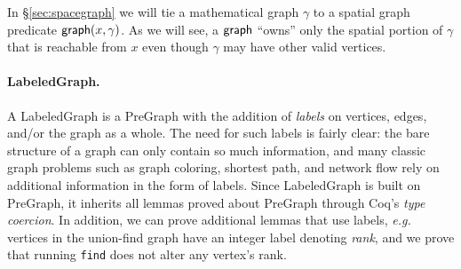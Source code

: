 \hide
{In \S\ref{sec:spacegraph} we will tie a mathematical graph $\gamma$ to 
a spatial graph predicate
$\mathsf{graph}(x, \gamma)$.   As we will see, a $\mathsf{graph}$ ``owns'' only the
spatial portion of $\gamma$ that is reachable
from $x$ even though $\gamma$ may have other valid vertices.
} %



\vspace{-0.75ex}

\paragraph{LabeledGraph.}
A LabeledGraph is a PreGraph with the addition of \emph{labels} on
vertices, edges, and/or the graph as a whole. The need for such labels
is fairly clear: the bare structure of a graph can only contain so
much information, and many classic graph problems such as graph
coloring, shortest path, and network flow rely on additional
information in the form of labels. Since
LabeledGraph is built on PreGraph, it inherits all lemmas proved about
PreGraph through Coq's \emph{type coercion}. 
In addition, we can prove additional lemmas that use labels,
\emph{e.g.} vertices in the union-find graph have an integer label denoting \emph{rank},
and we prove that running \texttt{find} does not alter any vertex's rank.



